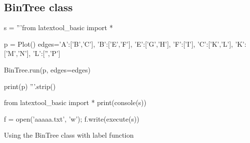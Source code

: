 \newpage
\subsection{BinTree class}

\begin{python}
s = '''from latextool_basic import *

p = Plot()
edges={'A':['B','C'],
       'B':['E','F'],
       'E':['G','H'],
       'F':['I'],
       'C':['K','L'],
       'K':['M','N'],
       'L':['','P']}

BinTree.run(p, edges=edges)
     
print(p)
'''.strip()

from latextool_basic import *
print(console(s))

f = open('aaaaa.txt', 'w'); f.write(execute(s))
\end{python}




\newpage
Using the BinTree class with label function






